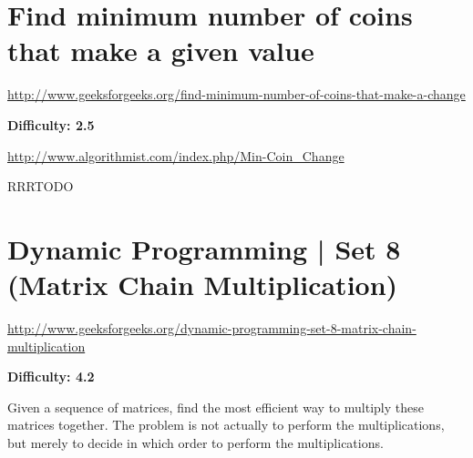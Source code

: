 
\section{Find minimum number of coins that make a given value
  \label{secGFGDP}}

\url{http://www.geeksforgeeks.org/find-minimum-number-of-coins-that-make-a-change}

\textbf{Difficulty: 2.5}

\textbf{}


\url{http://www.algorithmist.com/index.php/Min-Coin\_Change}

RRRTODO

\RayNotesBegin



\RayNotesEnd

\textbf{}




\section{Dynamic Programming | Set 8 (Matrix Chain Multiplication)
  \label{secGFGDPSet8MatChainMult}}

\url{http://www.geeksforgeeks.org/dynamic-programming-set-8-matrix-chain-multiplication}

\textbf{Difficulty: 4.2}

Given a sequence of matrices, find the most efficient way to multiply these
matrices together. The problem is not actually to perform the
multiplications, but merely to decide in which order to perform the
multiplications.

